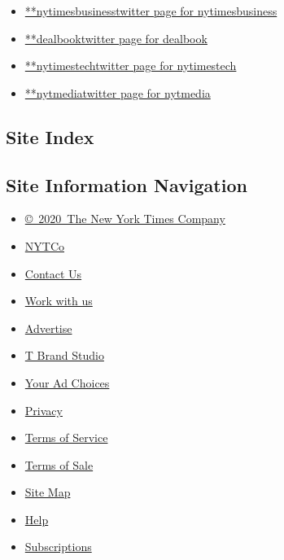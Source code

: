 \begin{itemize}
\tightlist
\item
  \href{https://twitter.com/nytimesbusiness}{**nytimesbusinesstwitter
  page for nytimesbusiness}
\item
  \href{https://twitter.com/dealbook}{**dealbooktwitter page for
  dealbook}
\item
  \href{https://twitter.com/nytimestech}{**nytimestechtwitter page for
  nytimestech}
\item
  \href{https://twitter.com/nytmedia}{**nytmediatwitter page for
  nytmedia}
\end{itemize}

\hypertarget{site-index}{%
\subsection{Site Index}\label{site-index}}

\hypertarget{site-information-navigation}{%
\subsection{Site Information
Navigation}\label{site-information-navigation}}

\begin{itemize}
\tightlist
\item
  \href{https://help.nytimes3xbfgragh.onion/hc/en-us/articles/115014792127-Copyright-notice}{©~2020~The
  New York Times Company}
\end{itemize}

\begin{itemize}
\tightlist
\item
  \href{https://www.nytco.com/}{NYTCo}
\item
  \href{https://help.nytimes3xbfgragh.onion/hc/en-us/articles/115015385887-Contact-Us}{Contact
  Us}
\item
  \href{https://www.nytco.com/careers/}{Work with us}
\item
  \href{https://nytmediakit.com/}{Advertise}
\item
  \href{http://www.tbrandstudio.com/}{T Brand Studio}
\item
  \href{https://www.nytimes3xbfgragh.onion/privacy/cookie-policy\#how-do-i-manage-trackers}{Your
  Ad Choices}
\item
  \href{https://www.nytimes3xbfgragh.onion/privacy}{Privacy}
\item
  \href{https://help.nytimes3xbfgragh.onion/hc/en-us/articles/115014893428-Terms-of-service}{Terms
  of Service}
\item
  \href{https://help.nytimes3xbfgragh.onion/hc/en-us/articles/115014893968-Terms-of-sale}{Terms
  of Sale}
\item
  \href{https://spiderbites.nytimes3xbfgragh.onion}{Site Map}
\item
  \href{https://help.nytimes3xbfgragh.onion/hc/en-us}{Help}
\item
  \href{https://www.nytimes3xbfgragh.onion/subscription?campaignId=37WXW}{Subscriptions}
\end{itemize}
